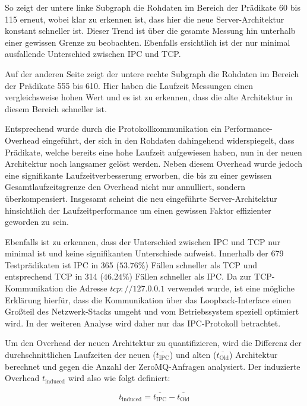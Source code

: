 So zeigt der untere linke Subgraph die Rohdaten im Bereich der Prädikate 60 bis 115 erneut,
wobei klar zu erkennen ist, dass hier die neue Server-Architektur konstant schneller ist.
Dieser Trend ist über die gesamte Messung hin unterhalb einer gewissen Grenze zu beobachten.
Ebenfalls ersichtlich ist der nur minimal ausfallende Unterschied zwischen IPC und TCP.

Auf der anderen Seite zeigt der untere rechte Subgraph die Rohdaten im Bereich der Prädikate 555 bis 610.
Hier haben die Laufzeit Messungen einen vergleichsweise hohen Wert und es ist zu erkennen,
dass die alte Architektur in diesem Bereich schneller ist. 

Entsprechend wurde durch die Protokollkommunikation ein Performance-Overhead eingeführt, der sich in den Rohdaten dahingehend widerspiegelt,
dass Prädikate, welche bereits eine hohe Laufzeit aufgewiesen haben, nun in der neuen Architektur noch langsamer gelöst werden.
Neben diesem Overhead wurde jedoch eine signifikante Laufzeitverbesserung erworben, die bis zu einer gewissen Gesamtlaufzeitsgrenze den
Overhead nicht nur annulliert, sondern überkompensiert.
Insgesamt scheint die neu eingeführte Server-Architektur hinsichtlich der Laufzeitperformance um einen gewissen Faktor effizienter geworden zu sein.

Ebenfalls ist zu erkennen, dass der Unterschied zwischen IPC und TCP nur minimal ist und keine signifikanten Unterschiede aufweist.
Innerhalb der 679 Testprädikaten ist IPC in 365 ($53.76\%$) Fällen schneller als TCP und entsprechend TCP in 314 ($46.24\%$) Fällen schneller als IPC.
Da zur TCP-Kommunikation die Adresse  $tcp://127.0.0.1$ verwendet wurde, ist eine mögliche Erklärung hierfür, dass die Kommunikation über das Loopback-Interface
einen Großteil des Netzwerk-Stacks umgeht und vom Betriebssystem speziell optimiert wird.
In der weiteren Analyse wird daher nur das IPC-Protokoll betrachtet.


Um den Overhead der neuen Architektur zu quantifizieren,
wird die Differenz der durchschnittlichen Laufzeiten der neuen ($\overline{t_\text{IPC}}$) und alten ($\overline{t_\text{Old}}$) Architektur berechnet
und gegen die Anzahl der ZeroMQ-Anfragen analysiert.
Der induzierte Overhead $t_\text{induced}$ wird also wie folgt definiert:

\begin{equation}
    t_\text{induced} = \overline{t_\text{IPC}} - \overline{t_\text{Old}}
\end{equation}

